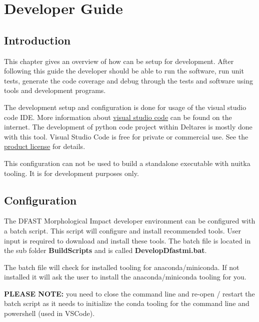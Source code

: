 \chapter{Developer Guide}

\section{Introduction}

This chapter gives an overview of how \dfastmi can be setup for development. After following this guide the developer should be able to run the software, run unit tests, generate the code coverage and debug through the tests and software using tools and development programs.

The development setup and configuration is done for usage of the visual studio code IDE. More information about \href{https://code.visualstudio.com/}{visual studio code} can be found on the internet.
The development of python code project within Deltares is mostly done with this tool. Visual Studio Code is free for private or commercial use. See the \href{https://code.visualstudio.com/license}{product license} for details.

\begin{Remark}
	\item This configuration can not be used to build a standalone executable with nuitka tooling. It is for development purposes only.
\end{Remark}

\section{Configuration}
The DFAST Morphological Impact developer environment can be configured with a batch script. This script will configure and install recommended tools. User input is required to download and install these tools. The batch file is located in the sub folder \textbf{BuildScripts} and is called \textbf{DevelopDfastmi.bat}.

The batch file will check for installed tooling for anaconda/miniconda. If not installed it will ask the user to install the anaconda/miniconda tooling for you. 

\begin{Remark}
	\item \textbf{PLEASE NOTE:} you need to close the command line and re-open / restart the batch script as it needs to initialize the conda tooling for the command line and powershell (used in VSCode).
\end{Remark}

